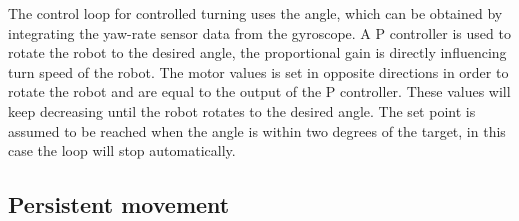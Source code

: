 The control loop for controlled turning uses the angle, which can be obtained by integrating the yaw-rate sensor data from the gyroscope.
A P controller is used to rotate the robot to the desired angle, the proportional gain is directly influencing turn speed of the robot.
The motor values is set in opposite directions in order to rotate the robot and are equal to the output of the P controller.
These values will keep decreasing until the robot rotates to the desired angle.
The set point is assumed to be reached when the angle is within two degrees of the target, in this case the loop will stop automatically.

\subsection{Persistent movement}


